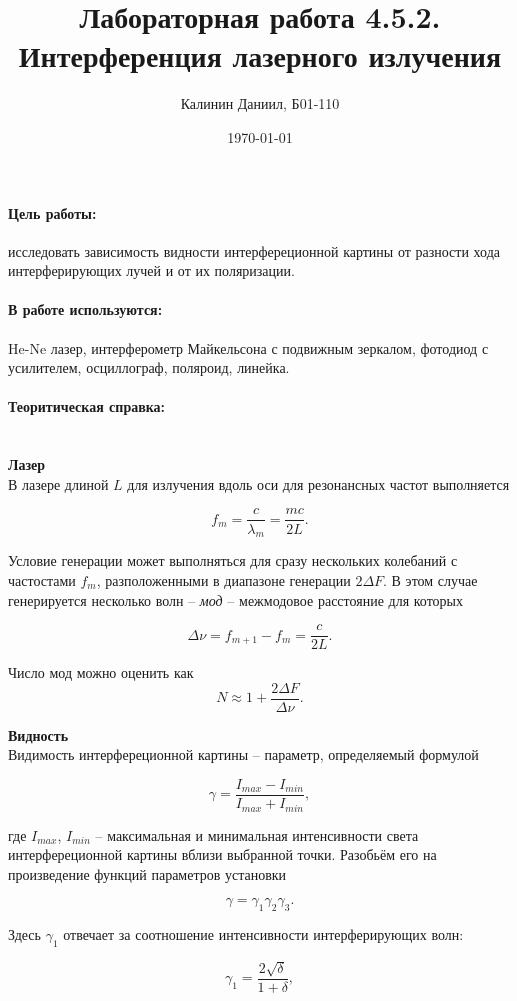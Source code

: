 \documentclass[a4paper, 12pt]{article}
\author{Калинин Даниил, Б01-110}
\date{\today}
\title{Лабораторная работа 4.5.2. Интерференция лазерного излучения}
\newcommand{\parag}[1]{\paragraph*{#1:}}
\begin{document}
\maketitle
\parindent=0cm

\parag {Цель работы}
исследовать зависимость видности интерфереционной картины от разности хода интерферирующих лучей и от их поляризации.

\parag {В работе используются}
He-Ne лазер, интерферометр Майкельсона с подвижным зеркалом, фотодиод с усилителем, осциллограф, поляроид, линейка.

\parag {Теоритическая справка} ~\\
\textbf{Лазер} \\
В лазере длиной $L$ для излучения вдоль оси для резонансных частот выполняется

\begin{equation}    
    f_m = \dfrac{c}{\lambda_m} = \dfrac{mc}{2L}.
\end{equation}

Условие генерации может выполняться для сразу нескольких колебаний с частостами $f_m$, разположенными в диапазоне генерации $2\Delta F$. В этом случае генерируется несколько волн -- \textit{мод} -- межмодовое расстояние для которых

\begin{equation}
    \label{eq:d_nu}
    \Delta \nu = f_{m+1} - f_m = \dfrac{c}{2L}.
\end{equation}

Число мод можно оценить как 
\begin{equation}
    N \approx 1 + \dfrac{2\Delta F}{\Delta \nu}.
\end{equation}

\textbf{Видность} \\ 
Видимость интерфереционной картины -- параметр, определяемый формулой

\begin{equation}
\gamma = \dfrac{I_{max} - I_{min}}{I_{max} + I_{min}},
\end{equation}

где $I_{max}$, $I_{min}$ -- максимальная и минимальная интенсивности света интерфереционной картины вблизи выбранной точки. Разобьём его на произведение функций параметров установки

$$
\gamma = \gamma_1 \gamma_2 \gamma_3.
$$

Здесь $\gamma_1$ отвечает за соотношение интенсивности интерферирующих волн:

\begin{equation}
    \label{eq:gamma1}
    \gamma_1 = \dfrac{2\sqrt{\delta}}{1+\delta},
\end{equation}
\end{document}
